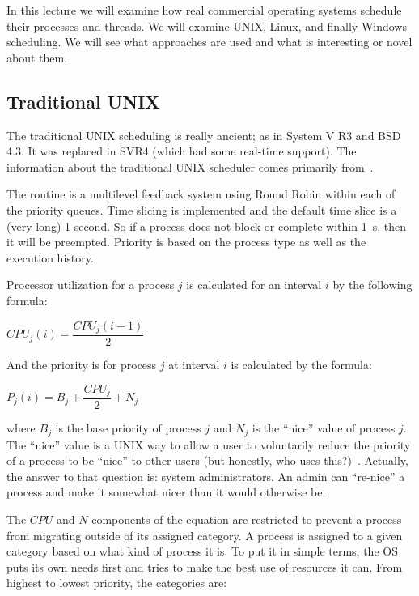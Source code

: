 




In this lecture we will examine how real commercial operating systems schedule their processes and threads. We will examine UNIX, Linux, and finally Windows scheduling. We will see what approaches are used and what is interesting or novel about them.

\subsection*{Traditional UNIX}

The traditional UNIX scheduling is really ancient; as in System V R3 and BSD 4.3. It was replaced in SVR4 (which had some real-time support). The information about the traditional UNIX scheduler comes primarily from~\cite{osi}.

The routine is a multilevel feedback system using Round Robin within each of the priority queues. Time slicing is implemented and the default time slice is a (very long) 1 second. So if a process does not block or complete within 1~s, then it will be preempted. Priority is based on the process type as well as the execution history.

Processor utilization for a process $j$ is calculated for an interval $i$ by the following formula:

\begin{center}
$CPU_{j}(i) = \dfrac{CPU_{j}(i - 1)}{2}$
\end{center}

And the priority is for process $j$ at interval $i$ is calculated by the formula:

\begin{center}
$P_{j}(i) = B_{j} + \dfrac{CPU_{j}}{2} + N_{j}$
\end{center}

where $B_{j}$ is the base priority of process $j$ and $N_{j}$ is the ``nice'' value of process $j$. The ``nice'' value is a UNIX way to allow a user to voluntarily reduce the priority of a process to be ``nice'' to other users (but honestly, who uses this?)~\cite{mos}. Actually, the answer to that question is: system administrators. An admin can ``re-nice'' a process and make it somewhat nicer than it would otherwise be.

The $CPU$ and $N$ components of the equation are restricted to prevent a process from migrating outside of its assigned category. A process is assigned to a given category based on what kind of process it is. To put it in simple terms, the OS puts its own needs first and tries to make the best use of resources it can. From highest to lowest priority, the categories are:

